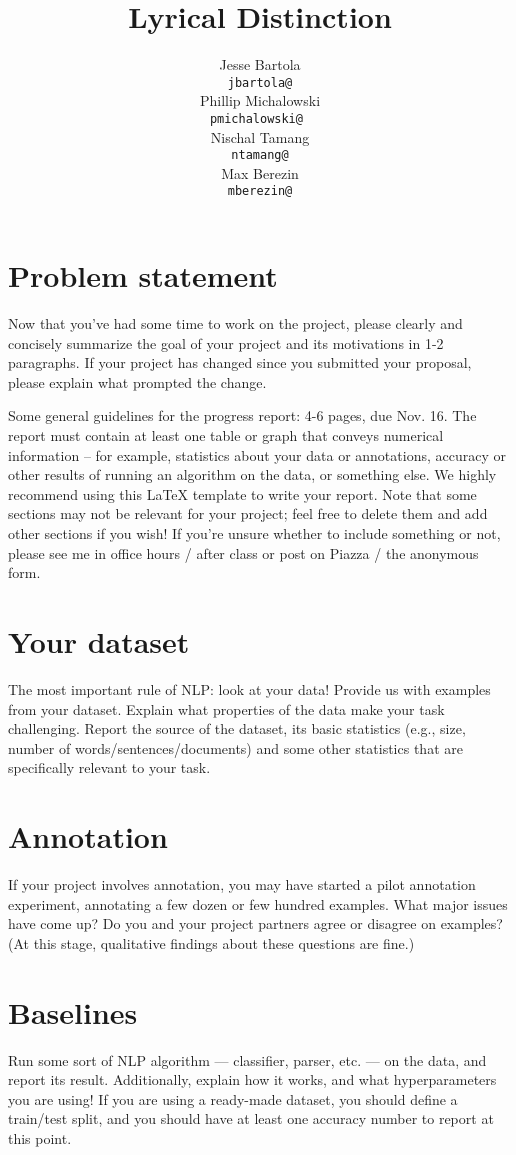 \documentclass[11pt,a4paper]{article}
\title{Lyrical Distinction}
\author{Jesse Bartola \\
      {\tt jbartola@} \\\And
      Phillip Michalowski \\
      {\tt pmichalowski@ } \\\And
      Nischal Tamang \\
      {\tt ntamang@} \\\And
      Max Berezin \\
      {\tt mberezin@} \\}
\date{}
\begin{document}
    \maketitle
    
    \section{Problem statement}
    Now that you've had some time to work on the project, please clearly and concisely summarize the goal of your project and its motivations in 1-2 paragraphs. If your project has changed since you submitted your proposal, please explain what prompted the change.
    
    Some general guidelines for the progress report: 4-6 pages, due Nov. 16. The report must contain at least one table or graph that conveys numerical information – for example, statistics about your data or annotations, accuracy or other results of running an algorithm on the data, or something else. We highly recommend using this LaTeX template to write your report. Note that some sections may not be relevant for your project; feel free to delete them and add other sections if you wish! If you're unsure whether to include something or not, please see me in office hours / after class or post on Piazza / the anonymous form.
    
    \section{Your dataset}
    The most important rule of NLP: look at your data! Provide us with examples from your dataset. Explain what properties of the data make your task challenging. Report the source of the dataset, its basic statistics (e.g., size, number of words/sentences/documents) and some other statistics that are specifically relevant to your task. 
    
    \section{Annotation}
    If your project involves annotation, you may have started a pilot annotation experiment, annotating a few dozen or few hundred examples. What major issues have come up? Do you and your project partners agree or disagree on examples? (At this stage, qualitative findings about these questions are fine.)
    
    \section{Baselines}
    Run some sort of NLP algorithm — classifier, parser, etc. — on the data, and report its result. Additionally, explain how it works, and what hyperparameters you are using! If you are using a ready-made dataset, you should define a train/test split, and you should have at least one accuracy number to report at this point.
    
\end{document}
